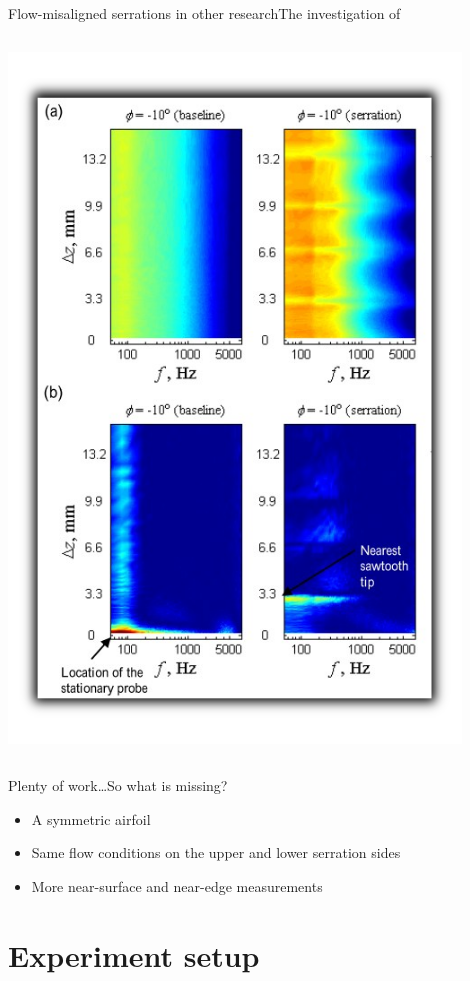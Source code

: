 \documentclass[xcolor=table,aspectratio=169]{beamer}
\begin{document}
\begin{frame}[c]{Flow-misaligned serrations in other research}{The investigation of \cite{Vathylakis2016}}
\begin{columns}
\begin{center}
            \includegraphics[width=0.90\textwidth]{media/Vathylakis2.png}
        \end{center}
    \end{columns}
\end{frame}

\begin{frame}{Plenty of work\ldots}{So what is missing?}
    \begin{itemize}
        \item A symmetric airfoil
        \item Same flow conditions on the upper and lower serration sides
        \item More near-surface and near-edge measurements
    \end{itemize}
\end{frame}

\section{Experiment setup}
\CurrentSection
\end{document}
